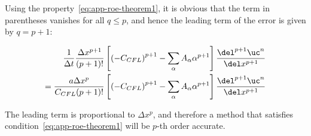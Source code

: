 Using the property~\ref{eq:app-roe-theorem1}, it is obvious that the term in parentheses vanishes
for all $q \leq p$, and hence the leading term of the error is given by $q = p +1$:

\begin{align}
\frac{1}{\Delta t} \frac{\Delta x^{p + 1}}{(p + 1)!} \left[
    \left(- C_{CFL} \right)^{p + 1} - \sum_\alpha A_\alpha \alpha^{p + 1}
    \right] \frac{\del^{p + 1} \uc^n}{\del x^{p + 1}} \\
=
\frac{a \Delta x^p}{C_{CFL} (p + 1)!} \left[
    \left(- C_{CFL} \right)^{p + 1} - \sum_\alpha A_\alpha \alpha^{p + 1}
    \right] \frac{\del^{p + 1} \uc^n}{\del x^{p + 1}}
\end{align}


The leading term is proportional to $\Delta x^p$, and therefore a method that satisfies
condition~\ref{eq:app-roe-theorem1} will be $p$-th order accurate.
